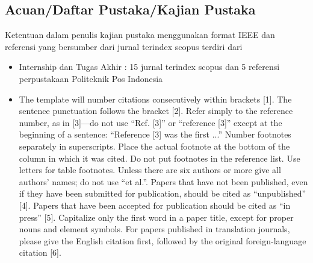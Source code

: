 \begin{enumerate}
\section{Acuan/Daftar Pustaka/Kajian Pustaka}
Ketentuan dalam penulis kajian pustaka menggunakan format IEEE dan referensi yang bersumber dari jurnal terindex scopus terdiri dari
\begin{itemize}
\item
Internship dan Tugas Akhir : 15 jurnal terindex scopus dan 5 referensi perpustakaan Politeknik Pos Indonesia

\item
The template will number citations consecutively within brackets [1]. The sentence punctuation follows the bracket [2]. Refer simply to the reference number, as in [3]—do not use “Ref. [3]” or “reference [3]” except at the beginning of a sentence: “Reference [3] was the first ...”
Number footnotes separately in superscripts. Place the actual footnote at the bottom of the column in which it was cited. Do not put footnotes in the reference list. Use letters for table footnotes.
Unless there are six authors or more give all authors’ names; do not use “et al.”. Papers that have not been published, even if they have been submitted for publication, should be cited as “unpublished” [4]. Papers that have been accepted for publication should be cited as “in press” [5]. Capitalize only the first word in a paper title, except for proper nouns and element symbols.
For papers published in translation journals, please give the English citation first, followed by the original foreign-language citation [6].

\end{itemize}
\end{enumerate}

 